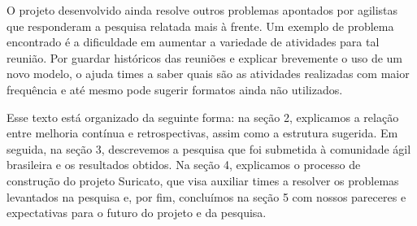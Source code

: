 O projeto desenvolvido ainda resolve outros problemas apontados por agilistas que responderam a pesquisa relatada mais à frente. Um exemplo de problema encontrado é a dificuldade em aumentar a variedade de atividades para tal reunião. Por guardar históricos das reuniões e explicar brevemente o uso de um novo modelo, o \suricato{} ajuda times a saber quais são as atividades realizadas com maior frequência e até mesmo pode sugerir formatos ainda não utilizados.

Esse texto está organizado da seguinte forma: na seção 2, explicamos a relação entre melhoria contínua e retrospectivas, assim como a estrutura sugerida. Em seguida, na seção 3, descrevemos a pesquisa que foi submetida à comunidade ágil brasileira e os resultados obtidos. Na seção 4, explicamos o processo de construção do projeto Suricato, que visa auxiliar times a resolver os problemas levantados na pesquisa e, por fim, concluímos na seção 5 com nossos pareceres e expectativas para o futuro do projeto e da pesquisa.